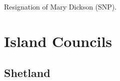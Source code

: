 \documentclass[a4paper,openany]{book}
\begin{document}
\begin{resultsiii}

Resignation of Mary Dickson (SNP).

%
%
%
%
%
%
%

\section{Island Councils}

\subsection*{Shetland}


\end{resultsiii}
\end{document}
